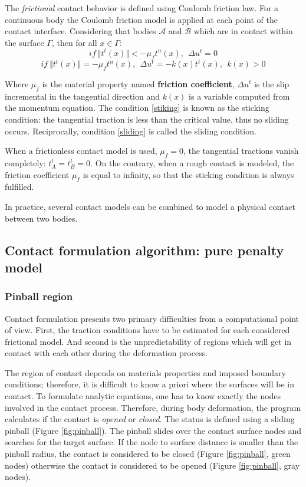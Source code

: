 The \textit{frictional} contact behavior is defined using Coulomb friction law. For a continuous body the Coulomb friction model is applied at each point of the contact interface.
Considering that bodies $\mathcal{A}$ and $\mathcal{B}$ which are in contact within the surface $\Gamma$, then for all $x \in \Gamma$:
\begin{equation}
\label{stiking}
if \ \Vert t^t(x) \Vert < -\mu_f t^n(x),\ \ \Delta u^t=0 
\end{equation}
\begin{equation}
\label{sliding}
if \ \Vert t^t(x) \Vert = -\mu_f t^n(x),\ \ \Delta u^t=-k(x)t^t(x),\ \ k(x)>0
\end{equation}

Where $\mu_f$ is the material property named \textbf{friction coefficient},  $\Delta u^t$ is the slip incremental in the tangential direction and $k(x)$ is a variable computed from the momentum equation. The condition \ref{stiking} is known as the sticking condition: the tangential traction is less than the critical value, thus no sliding occurs. Reciprocally, condition \ref{sliding} is called the sliding condition.

When a frictionless contact model is used, $\mu_f = 0$, the tangential tractions vanish completely: $t_A^t = t_B^t = 0$. On the contrary, when a rough contact is modeled, the friction coefficient $\mu_f$ is equal to infinity, so that the sticking condition is always fulfilled. 

In practice, several contact models can be combined to model a physical contact between two bodies.   

\subsection{Contact formulation algorithm: pure penalty model}%

\subsubsection*{Pinball region}

Contact formulation presents two primary difficulties from a computational point of view. First, the traction conditions have to be estimated for each considered frictional model. And second is the unpredictability of regions which will get in contact with each other during the deformation process.

The region of contact depends on materials properties and imposed boundary conditions; therefore, it is difficult to know a priori where the surfaces will be in contact. To formulate analytic equations, one has to know exactly the nodes involved in the contact process. Therefore, during body deformation, the program calculates if the contact is \textit{opened} or \textit{closed}. The status is defined using a sliding pinball (Figure \ref{fig:pinball}). The pinball slides over the contact surface nodes and searches for the target surface. If the node to surface distance is smaller than the pinball radius, the contact is considered to be closed (Figure \ref{fig:pinball}, green nodes) otherwise the contact is considered to be opened (Figure \ref{fig:pinball}, gray nodes).    

